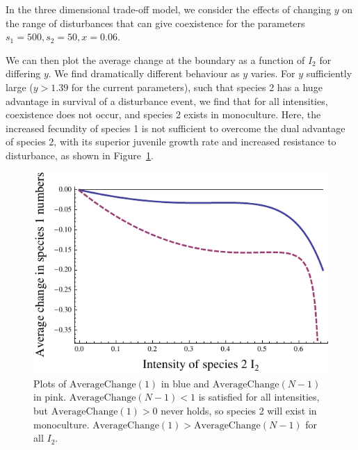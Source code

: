 \documentclass[preprint,10pt,reqno]{amsart}
\begin{document}
In the three dimensional trade-off model, we consider the effects of changing $y$ on the range of disturbances that can give coexistence for the parameters $s_1=500,s_2=50,x=0.06$.

We can then plot the average change at the boundary as a function of $I_2$ for differing $y$. We find dramatically different behaviour as $y$ varies. For $y$ sufficiently large ($y>1.39$ for the current parameters), such that species 2 has a huge advantage in survival of a disturbance event, we find that for all intensities, coexistence does not occur, and species 2 exists in monoculture. Here, the increased fecundity of species 1 is not sufficient to overcome the dual advantage of species 2, with its superior juvenile growth rate and increased resistance to disturbance, as shown in Figure~\ref{largey}.
\begin{figure}[htbp]
\includegraphics[width=4.5in]{highy}
\caption{Plots of $\text{AverageChange}(1)$ in blue and $\text{AverageChange}(N-1)$ in pink. $\text{AverageChange}(N-1)<1$ is satisfied for all intensities, but $\text{AverageChange}(1)>0$ never holds, so species 2 will exist in monoculture. $\text{AverageChange}(1)>\text{AverageChange}(N-1)$ for all $I_2$.}
\label{largey}
\end{figure}
\end{document}
